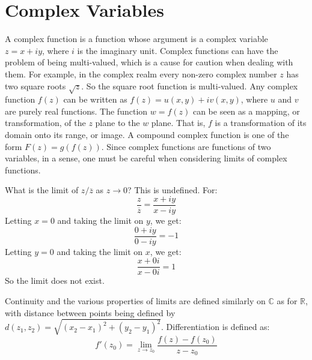 \documentclass[crop=false,class=book,oneside]{standalone}
\begin{document}
    \section{Complex Variables}
        A complex function is a function whose argument is a complex
        variable $z=x+iy$, where $i$ is the imaginary unit. Complex
        functions can have the problem of being multi-valued, which
        is a cause for caution when dealing with them. For example,
        in the complex realm every non-zero complex number $z$
        has two square roots $\sqrt{z}$. So the square root
        function is multi-valued. Any complex function $f(z)$ can
        be written as $f(z)=u(x,y)+iv(x,y)$, where $u$ and $v$ are
        purely real functions. The function $w=f(z)$ can be seen
        as a mapping, or transformation, of the $z$ plane to
        the $w$ plane. That is, $f$ is a transformation of
        its domain onto its range, or image. A compound complex
        function is one of the form $F(z)=g(f(z))$. Since complex
        functions are functions of two variables, in a sense, one
        must be careful when considering limits of complex functions.
        \begin{example}
            What is the limit of $z/\overline{z}$ as $z\rightarrow{0}$?
            This is undefined. For:
            \begin{equation*}
                \frac{z}{\overline{z}}=\frac{x+iy}{x-iy}
            \end{equation*}
            Letting $x=0$ and taking the limit on $y$,
            we get:
            \begin{equation*}
                \frac{0+iy}{0-iy}=-1
            \end{equation*}
            Letting $y=0$ and taking the limit on $x$,
            we get:
            \begin{equation*}
                \frac{x+0i}{x-0i}=1
            \end{equation*}
            So the limit does not exist.
        \end{example}
        Continuity and the various properties of limits
        are defined similarly on $\mathbb{C}$ as for
        $\mathbb{R}$, with distance between points being
        defined by
        $d(z_{1},z_{2})=\sqrt{(x_{2}-x_{1})^{2}+(y_{2}-y_{1})^{2}}$.
        Differentiation is defined as:
        \begin{equation*}
            f'(z_{0})=\lim_{z\rightarrow{z_{0}}}\frac{f(z)-f(z_{0})}{z-z_{0}}
        \end{equation*}
\end{document}
